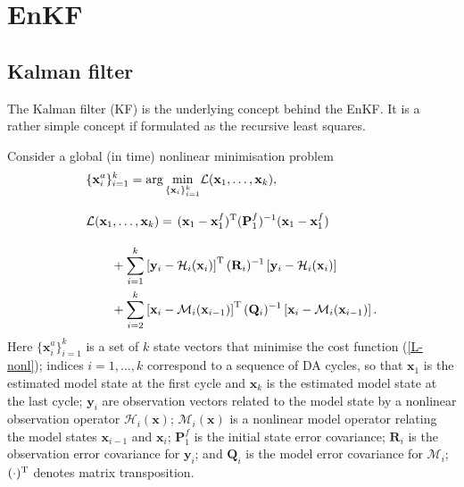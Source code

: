 \documentclass[11pt]{report}
\newcommand{\mb} {\mathbf}
\newcommand{\T}{^{\tiny \mathrm T}}
\begin{document}
\chapter{EnKF}

\section{Kalman filter}

The Kalman filter (KF) is the underlying concept behind the EnKF.
It is a rather simple concept if formulated as the recursive least squares.

Consider a global (in time) nonlinear minimisation problem
\begin{align}
  \label{min-nonl}
  &\{\mb x_i^a\}_{i=1}^k = \arg \underset{\{\mb x_i\}_{i = 1}^k}\min \mathcal L(\mb x_1, \dots, \mb x_k),\\
  \nonumber
  &\mathcal L(\mb x_1, \dots, \mb x_k)  = \left . (\mb x_1 - \mb x_1^f)\T (\mb P_1^f)^{-1} (\mb x_1 - \mb x_1^f) 
  \vphantom{\sum_{i = 2}^{k}}
  \right . \\
  \nonumber
  & \qquad + \sum_{i = 1}^k \left [ \mb y_i - \mathcal H_i(\mb x_i) \right ] \T (\mb R_i)^{-1} \left [ \mb y_i - \mathcal H_i(\mb x_i) \right ] \\ 
  & \qquad + \sum_{i = 2}^{k} \left [ \mb x_i - \mathcal M_i(\mb x_{i-1}) \right ]\T (\mb Q_i)^{-1} \left [ \mb x_i - \mathcal M_i(\mb x_{i-1}) \right ].
  \label{L-nonl}
\end{align}
Here $\{\mb x_i^a\}_{i=1}^k$ is a set of $k$ state vectors that minimise the cost function (\ref{L-nonl}); indices $i = 1,\dots,k$ correspond to a sequence of DA cycles, so that $\mb x_1$ is the estimated model state at the first cycle and $\mb x_k$ is the estimated model state at the last cycle; $\mb y_i$ are observation vectors related to the model state by a nonlinear observation operator $\mathcal H_i(\mb x)$; $\mathcal M_i(\mb x)$ is a nonlinear model operator relating the model states $\mb x_{i - 1}$ and $\mb x_i$; $\mb P_1^f$ is the initial state error covariance; $\mb R_i$ is the observation error covariance for $\mb y_i$; and $\mb Q_i$ is the model error covariance for $\mathcal M_i$; $(\cdot)\T$ denotes matrix transposition.
\end{document}
